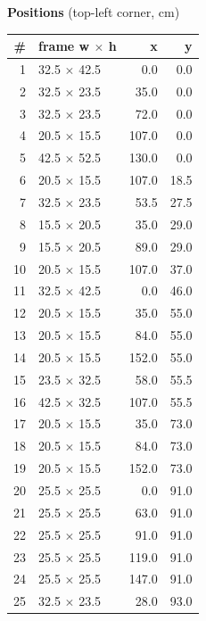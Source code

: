 \documentclass[a4paper,landscape,10pt]{article}
\begin{document}
\begin{minipage}[t]{0.25\textwidth}
\vspace{8pt}
{\bfseries Positions} (top-left corner, cm)\\[2pt]
\tiny
\begin{tabular}{@{}r l r r@{}}
\toprule
\# & frame w $\times$ h & x & y \\
\midrule
1 & 32.5 $\times$ 42.5 & 0.0 & 0.0 \\
2 & 32.5 $\times$ 23.5 & 35.0 & 0.0 \\
3 & 32.5 $\times$ 23.5 & 72.0 & 0.0 \\
4 & 20.5 $\times$ 15.5 & 107.0 & 0.0 \\
5 & 42.5 $\times$ 52.5 & 130.0 & 0.0 \\
6 & 20.5 $\times$ 15.5 & 107.0 & 18.5 \\
7 & 32.5 $\times$ 23.5 & 53.5 & 27.5 \\
8 & 15.5 $\times$ 20.5 & 35.0 & 29.0 \\
9 & 15.5 $\times$ 20.5 & 89.0 & 29.0 \\
10 & 20.5 $\times$ 15.5 & 107.0 & 37.0 \\
11 & 32.5 $\times$ 42.5 & 0.0 & 46.0 \\
12 & 20.5 $\times$ 15.5 & 35.0 & 55.0 \\
13 & 20.5 $\times$ 15.5 & 84.0 & 55.0 \\
14 & 20.5 $\times$ 15.5 & 152.0 & 55.0 \\
15 & 23.5 $\times$ 32.5 & 58.0 & 55.5 \\
16 & 42.5 $\times$ 32.5 & 107.0 & 55.5 \\
17 & 20.5 $\times$ 15.5 & 35.0 & 73.0 \\
18 & 20.5 $\times$ 15.5 & 84.0 & 73.0 \\
19 & 20.5 $\times$ 15.5 & 152.0 & 73.0 \\
20 & 25.5 $\times$ 25.5 & 0.0 & 91.0 \\
21 & 25.5 $\times$ 25.5 & 63.0 & 91.0 \\
22 & 25.5 $\times$ 25.5 & 91.0 & 91.0 \\
23 & 25.5 $\times$ 25.5 & 119.0 & 91.0 \\
24 & 25.5 $\times$ 25.5 & 147.0 & 91.0 \\
25 & 32.5 $\times$ 23.5 & 28.0 & 93.0 \\
\bottomrule
\end{tabular}
\end{minipage}
\clearpage
\end{document}
